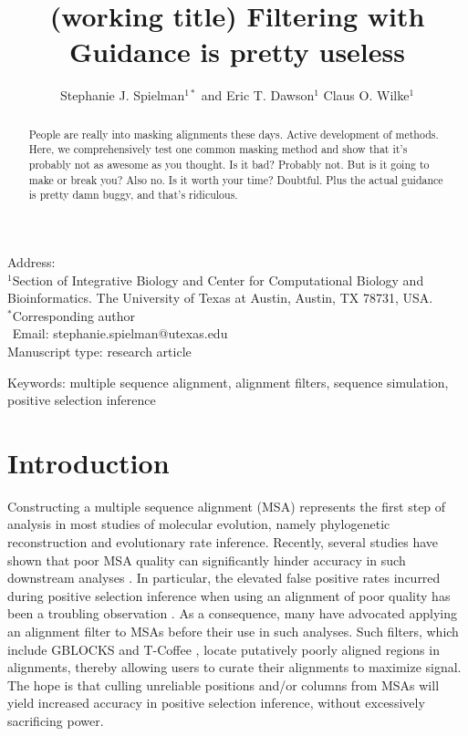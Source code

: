 \documentclass[10pt]{article}
\begin{document}
\title{\textbf{(working title) Filtering with Guidance is pretty useless}}
\author{Stephanie J. Spielman$^{1*}$ and Eric T. Dawson$^{1}$ Claus O. Wilke$^{1}$}
\date{}

\maketitle
\noindent
Address:\\
$^1$Section of Integrative Biology and Center for Computational Biology and Bioinformatics. The University
of Texas at Austin, Austin, TX 78731, USA.\\

\bigskip
\noindent
$^*$Corresponding author\\
$\phantom{^*}$Email: stephanie.spielman@utexas.edu\\

\bigskip
\noindent
Manuscript type: research article

\bigskip
\noindent Keywords: multiple sequence alignment, alignment filters, sequence simulation, positive selection inference

\newpage
\begin{abstract}
	People are really into masking alignments these days. Active development of methods. Here, we comprehensively test one common masking method and show that it's probably not as awesome as you thought. Is it bad? Probably not. But is it going to make or break you? Also no. Is it worth your time? Doubtful. Plus the actual guidance is pretty damn buggy, and that's ridiculous.
\end{abstract}


\section*{Introduction}
Constructing a multiple sequence alignment (MSA) represents the first step of analysis in most studies of molecular evolution, namely phylogenetic reconstruction and evolutionary rate inference. Recently, several studies have shown that poor MSA quality can significantly hinder accuracy in such downstream analyses \citep{Jordan2011, MarkovaRaina2011, Dwivedi2009, Talavera2007, Ogden2006}. In particular, the elevated false positive rates incurred during positive selection inference when using an alignment of poor quality has been a troubling observation  \citep{Jordan2011, Privman2012, Schneider2009, Fletcher2010}. As a consequence, many have advocated applying an alignment filter to MSAs before their use in such analyses. Such filters, which include GBLOCKS \citep{Castresana2000} and T-Coffee \citep{Notredame2000}, locate   putatively poorly aligned regions in alignments, thereby allowing users to curate their alignments to maximize signal. The hope is that culling unreliable positions and/or columns from MSAs will yield increased accuracy in positive selection inference, without excessively sacrificing power.
\end{document}

